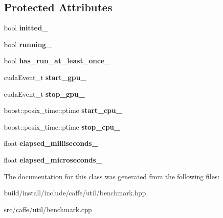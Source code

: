 \subsection*{Protected Attributes}
\begin{DoxyCompactItemize}
\item 
\mbox{\label{classcaffe_1_1_timer_a2b39366d547f7a5638f53df589624def}} 
bool {\bfseries initted\+\_\+}
\item 
\mbox{\label{classcaffe_1_1_timer_a44483462010588661ce927c3b3ef6c3d}} 
bool {\bfseries running\+\_\+}
\item 
\mbox{\label{classcaffe_1_1_timer_a5a8439af494a4874ce47b6334bdb7da6}} 
bool {\bfseries has\+\_\+run\+\_\+at\+\_\+least\+\_\+once\+\_\+}
\item 
\mbox{\label{classcaffe_1_1_timer_aaeef1178d30cea3cebf7a4a0eac02e6f}} 
cuda\+Event\+\_\+t {\bfseries start\+\_\+gpu\+\_\+}
\item 
\mbox{\label{classcaffe_1_1_timer_a7802204485bd7825f8bd7fad90bbdfd7}} 
cuda\+Event\+\_\+t {\bfseries stop\+\_\+gpu\+\_\+}
\item 
\mbox{\label{classcaffe_1_1_timer_a3cbebb809a42eda35357bdc7363b9afc}} 
boost\+::posix\+\_\+time\+::ptime {\bfseries start\+\_\+cpu\+\_\+}
\item 
\mbox{\label{classcaffe_1_1_timer_acca9361263d52a7e28d291933220e2f5}} 
boost\+::posix\+\_\+time\+::ptime {\bfseries stop\+\_\+cpu\+\_\+}
\item 
\mbox{\label{classcaffe_1_1_timer_a7aa3bf3a38cde89a068e48fee8b1c623}} 
float {\bfseries elapsed\+\_\+milliseconds\+\_\+}
\item 
\mbox{\label{classcaffe_1_1_timer_a3b16e3ffae9ce82acfb50b44377d611f}} 
float {\bfseries elapsed\+\_\+microseconds\+\_\+}
\end{DoxyCompactItemize}


The documentation for this class was generated from the following files\+:\begin{DoxyCompactItemize}
\item 
build/install/include/caffe/util/benchmark.\+hpp\item 
src/caffe/util/benchmark.\+cpp\end{DoxyCompactItemize}
